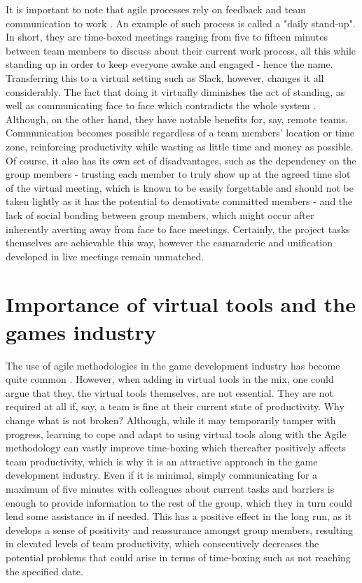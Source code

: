 \documentclass{scrartcl}
\begin{document}
It is important to note that agile processes rely on feedback and team communication to work \cite{Manifesto, Steve}. An example of such process is called a "daily stand-up". In short, they are time-boxed meetings ranging from five to fifteen minutes between team members to discuss about their current work process, all this while standing up in order to keep everyone awake and engaged - hence the name. \cite{McHugh} Transferring this to a virtual setting such as Slack, however, changes it all considerably. The fact that doing it virtually diminishes the act of standing, as well as communicating face to face which contradicts the whole system \cite{Lehmann}. Although, on the other hand, they have notable benefits for, say, remote teams. Communication becomes possible regardless of a team members' location or time zone, reinforcing productivity while wasting as little time and money as possible. Of course, it also has its own set of disadvantages, such as the dependency on the group members - trusting each member to truly show up at the agreed time slot of the virtual meeting, which is known to be easily forgettable and should not be taken lightly as it has the potential to demotivate committed members - and the lack of social bonding between group members, which might occur after inherently averting away from face to face meetings. \cite{Lehmann} Certainly, the project tasks themselves are achievable this way, however the camaraderie and unification developed in live meetings remain unmatched.

\section{Importance of virtual tools and the games industry}
The use of agile methodologies in the game development industry has become quite common \cite{Andre}. However, when adding in virtual tools in the mix, one could argue that they, the virtual tools themselves, are not essential. They are not required at all if, say, a team is fine at their current state of productivity. Why change what is not broken? Although, while it may temporarily tamper with progress, learning to cope and adapt to using virtual tools along with the Agile methodology can vastly improve time-boxing which thereafter positively affects team productivity, which is why it is an attractive approach in the game development industry. Even if it is minimal, simply communicating for a maximum of five minutes with colleagues about current tasks and barriers is enough to provide information to the rest of the group, which they in turn could lend some assistance in if needed. This has a positive effect in the long run, as it develops a sense of positivity and reassurance amongst group members, resulting in elevated levels of team productivity, which consecutively decreases the potential problems that could arise in terms of time-boxing such as not reaching the specified date.
\end{document}
